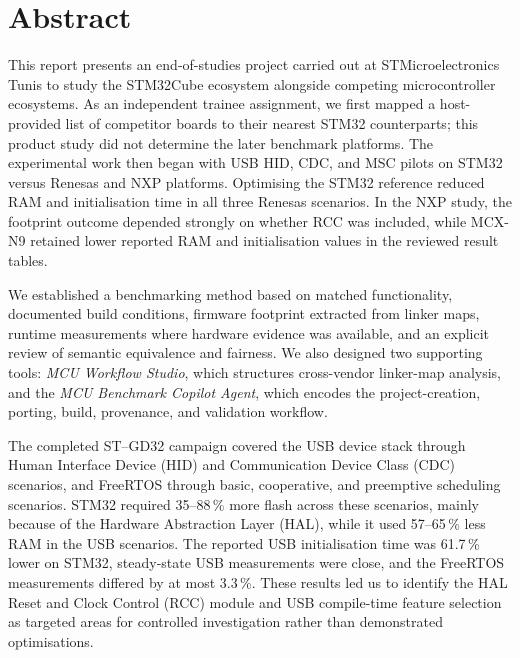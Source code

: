 \chapter*{Abstract}
{}

This report presents an end-of-studies project carried out at STMicroelectronics Tunis to
study the STM32Cube ecosystem alongside competing microcontroller ecosystems. As an
independent trainee assignment, we first mapped a host-provided list of competitor boards
to their nearest STM32 counterparts; this product study did not determine the later
benchmark platforms. The experimental work then began with USB HID, CDC, and MSC pilots on
STM32 versus Renesas and NXP platforms. Optimising the STM32 reference reduced RAM and
initialisation time in all three Renesas scenarios. In the NXP study, the footprint outcome
depended strongly on whether RCC was included, while MCX-N9 retained lower reported RAM and
initialisation values in the reviewed result tables.

We established a benchmarking method based on matched functionality, documented build
conditions, firmware footprint extracted from linker maps, runtime measurements where
hardware evidence was available, and an explicit review of semantic equivalence and
fairness. We also designed two supporting tools: \emph{MCU Workflow Studio}, which
structures cross-vendor linker-map analysis, and the \emph{MCU Benchmark Copilot Agent},
which encodes the project-creation, porting, build, provenance, and validation workflow.

The completed ST--GD32 campaign covered the USB device stack through Human Interface Device
(HID) and Communication Device Class (CDC) scenarios, and FreeRTOS through basic,
cooperative, and preemptive scheduling scenarios. STM32 required 35--88\,\% more flash across
these scenarios, mainly because of the Hardware Abstraction Layer (HAL), while it used
57--65\,\% less RAM in the USB scenarios. The reported USB initialisation time was
61.7\,\% lower on STM32, steady-state USB measurements were close, and the FreeRTOS
measurements differed by at most 3.3\,\%. These results led us to identify the HAL Reset and
Clock Control (RCC) module and USB compile-time feature selection as targeted areas for
controlled investigation rather than demonstrated optimisations.

